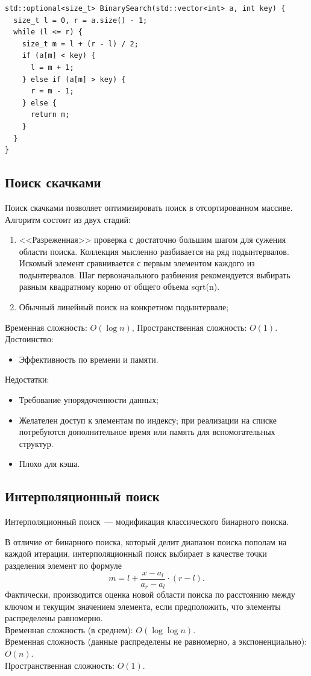 \begin{verbatim}
std::optional<size_t> BinarySearch(std::vector<int> a, int key) {
  size_t l = 0, r = a.size() - 1;
  while (l <= r) {
    size_t m = l + (r - l) / 2;
    if (a[m] < key) {
      l = m + 1;
    } else if (a[m] > key) {
      r = m - 1;
    } else {
      return m;
    }
  }
}
\end{verbatim}

\subsection{Поиск скачками}
Поиск скачками позволяет оптимизировать поиск в отсортированном массиве.
Алгоритм состоит из двух стадий:
\begin{enumerate}
  \item <<Разреженная>> проверка с достаточно большим шагом для сужения области
    поиска. Коллекция мысленно разбивается на ряд подынтервалов. Искомый
    элемент сравнивается с первым элементом каждого из подынтервалов.
    Шаг первоначального разбиения рекомендуется выбирать равным
    квадратному корню от общего объема sqrt(n).
  \item Обычный линейный поиск на конкретном подынтервале;
\end{enumerate}

Временная сложность: $O(\log n)$, Пространственная сложность: $O(1)$.
Достоинство:
\begin{itemize}
  \item Эффективность по времени и памяти.
\end{itemize}
Недостатки:
\begin{itemize}
  \item Требование упорядоченности данных;
  \item Желателен доступ к элементам по индексу; при реализации на
  списке потребуются дополнительное время или память для
  вспомогательных структур.
  \item Плохо для кэша.
\end{itemize}


\subsection{Интерполяционный поиск}
Интерполяционный поиск~--- модификация классического бинарного поиска.

В отличие от бинарного поиска, который делит диапазон поиска пополам на каждой итерации,
интерполяционный поиск выбирает в качестве точки разделения элемент по формуле $$m = l + \frac{x - a_l}{a_r-a_l} \cdot (r-l).$$
Фактически, производится оценка новой области поиска по расстоянию между ключом и текущим значением элемента, если предположить, что
элементы распределены равномерно.\\
Временная сложность (в среднем): $O(\log{\log{n}})$.\\
Временная сложность (данные распределены не равномерно, а экспоненциально): $O(n)$.\\
Пространственная сложность: $O(1)$.

